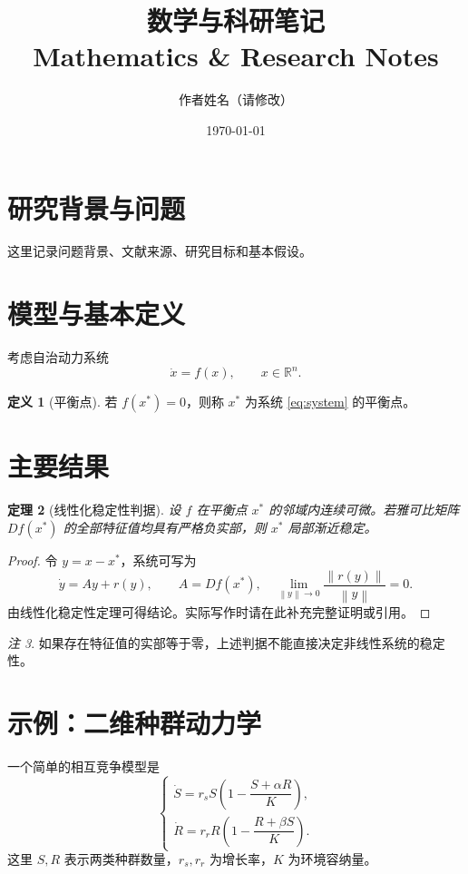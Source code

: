 \documentclass[12pt,a4paper]{ctexart}
\title{数学与科研笔记\\\large Mathematics \& Research Notes}
\author{作者姓名（请修改）}
\date{\today}
\theoremstyle{plain}
\newtheorem{theorem}{定理}[section]
\theoremstyle{definition}
\newtheorem{definition}[theorem]{定义}
\theoremstyle{remark}
\newtheorem{remark}[theorem]{注}
\newcommand{\R}{\mathbb{R}}
\newcommand{\norm}[1]{\left\lVert #1\right\rVert}
\begin{document}
\maketitle
\tableofcontents
\newpage

\section{研究背景与问题}
这里记录问题背景、文献来源、研究目标和基本假设。

\section{模型与基本定义}
考虑自治动力系统
\begin{equation}\label{eq:system}
    \dot{x}=f(x),\qquad x\in\R^n.
\end{equation}

\begin{definition}[平衡点]
若 $f(x^*)=0$，则称 $x^*$ 为系统 \eqref{eq:system} 的平衡点。
\end{definition}

\section{主要结果}
\begin{theorem}[线性化稳定性判据]\label{thm:stability}
设 $f$ 在平衡点 $x^*$ 的邻域内连续可微。若雅可比矩阵
$Df(x^*)$ 的全部特征值均具有严格负实部，则 $x^*$ 局部渐近稳定。
\end{theorem}

\begin{proof}
令 $y=x-x^*$，系统可写为
\begin{equation}
    \dot y=Ay+r(y),\qquad A=Df(x^*),\quad
    \lim_{\norm{y}\to0}\frac{\norm{r(y)}}{\norm{y}}=0.
\end{equation}
由线性化稳定性定理可得结论。实际写作时请在此补充完整证明或引用。
\end{proof}

\begin{remark}
如果存在特征值的实部等于零，上述判据不能直接决定非线性系统的稳定性。
\end{remark}

\section{示例：二维种群动力学}
一个简单的相互竞争模型是
\begin{equation}
\begin{cases}
\dot S=r_s S\left(1-\dfrac{S+\alpha R}{K}\right),\\[6pt]
\dot R=r_r R\left(1-\dfrac{R+\beta S}{K}\right).
\end{cases}
\end{equation}
这里 $S,R$ 表示两类种群数量，$r_s,r_r$ 为增长率，$K$ 为环境容纳量。
\end{document}
